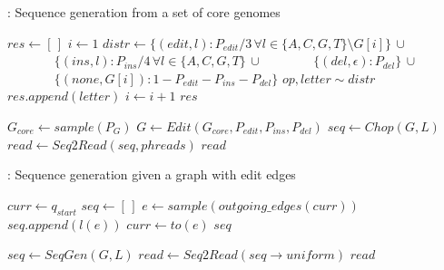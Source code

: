 \begin{algorithm}[H]
	\caption{\corem: Sequence generation from a set of core genomes }
	\label{core_model_sequence_generation}
	\begin{algorithmic}[1]
			\State $\mathit{res} \gets [\,]$
			\State $i \gets 1$
				\State $\mathit{distr} \gets \{ (\mathit{edit}, l): P_{edit}/3\, \forall l \in \{A, C, G, T\} \setminus G[i] \} \, \cup$
				\State $\phantom{\mathit{distr} \gets} \{ (\mathit{ins}, l): P_{ins}/4\, \forall l \in \{A, C, G, T\} \, \cup$
				\State $\phantom{\mathit{distr} \gets} \{ (\mathit{del}, \epsilon): P_{del} \} \, \cup$
				\Statex {}
				\State $\phantom{\mathit{distr} \gets} \{ (\mathit{none}, G[i]): 1-P_{edit}-P_{ins}-P_{del} \}$ 
				\State $\mathit{op}, \mathit{letter} \sim \mathit{distr}$
					\State $\mathit{res.append}(letter)$
				\Else
					\State $i \gets i + 1$
				\EndIf	
			\EndWhile
			\Return $\mathit{res}$
		\EndFunction

		\Statex

			\State $\mathit{G_{core}} \gets \mathit{sample}(P_G)$  
			\State $G \gets \mathit{Edit}(\mathit{G_{core}}, \mathit{P_{edit}}, \mathit{P_{ins}}, \mathit{P_{del}})$  
			\State $\mathit{seq} \gets \mathit{Chop}(G, L)$
			\State $\mathit{read} \gets \mathit{Seq2Read}(\mathit{seq}, \mathit{phreads})$
			\Return $\mathit{read}$
		\EndFunction
	\end{algorithmic}
\end{algorithm}

\begin{algorithm}[H] 
	\caption{\graphm: Sequence generation given a graph with edit edges}\label{sequence_generation}
	\begin{algorithmic}[1]
			\State $\mathit{curr} \gets q_{start}$ 
			\State $\mathit{seq} \gets [\,]$ 
					\State $e \gets \mathit{sample}(\mathit{outgoing\_edges}(\mathit{curr}))$
							\State $\mathit{seq.append}(l(e))$
					\EndIf
					\State $\mathit{curr} \gets \mathit{to}(e)$ 
			\EndWhile
			\Return $seq$
		\EndFunction

		\Statex

			\State $\mathit{seq} \gets \mathit{SeqGen}(G, L)$
			\State $\mathit{read} \gets \mathit{Seq2Read}(\mathit{seq} \to \mathit{uniform})$
			\Return $\mathit{read}$
		\EndFunction
	\end{algorithmic}
\end{algorithm}


